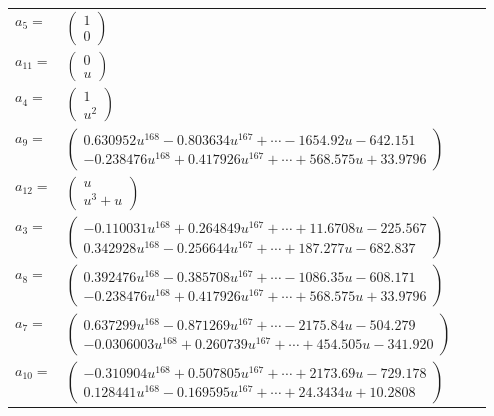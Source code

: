 \documentclass[1p]{elsarticle_modified}
\theoremstyle{definition}
\begin{document}
\begin{tabular}{m{7pt} m{180pt} m{7pt} m{180pt} }
\flushright $a_{5}=$&$\begin{pmatrix}1\\0\end{pmatrix}$ \\
\flushright $a_{11}=$&$\begin{pmatrix}0\\u\end{pmatrix}$ \\
\flushright $a_{4}=$&$\begin{pmatrix}1\\u^2\end{pmatrix}$ \\
\flushright $a_{9}=$&$\begin{pmatrix}0.630952 u^{168}-0.803634 u^{167}+\cdots-1654.92 u-642.151\\-0.238476 u^{168}+0.417926 u^{167}+\cdots+568.575 u+33.9796\end{pmatrix}$ \\
\flushright $a_{12}=$&$\begin{pmatrix}u\\u^3+u\end{pmatrix}$ \\
\flushright $a_{3}=$&$\begin{pmatrix}-0.110031 u^{168}+0.264849 u^{167}+\cdots+11.6708 u-225.567\\0.342928 u^{168}-0.256644 u^{167}+\cdots+187.277 u-682.837\end{pmatrix}$ \\
\flushright $a_{8}=$&$\begin{pmatrix}0.392476 u^{168}-0.385708 u^{167}+\cdots-1086.35 u-608.171\\-0.238476 u^{168}+0.417926 u^{167}+\cdots+568.575 u+33.9796\end{pmatrix}$ \\
\flushright $a_{7}=$&$\begin{pmatrix}0.637299 u^{168}-0.871269 u^{167}+\cdots-2175.84 u-504.279\\-0.0306003 u^{168}+0.260739 u^{167}+\cdots+454.505 u-341.920\end{pmatrix}$ \\
\flushright $a_{10}=$&$\begin{pmatrix}-0.310904 u^{168}+0.507805 u^{167}+\cdots+2173.69 u-729.178\\0.128441 u^{168}-0.169595 u^{167}+\cdots+24.3434 u+10.2808\end{pmatrix}$ \\

\end{tabular}
\end{document}
